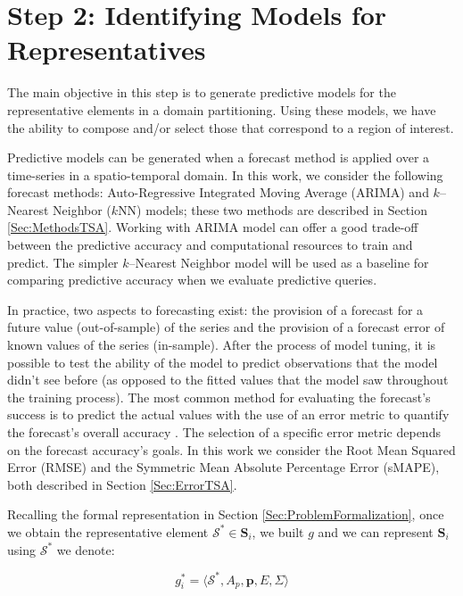 \section{Step 2: Identifying Models for Representatives}
\label{Sec:ModelRepresentatives}

The main objective in this step is to generate predictive models for the representative elements in a domain partitioning. Using these models, we have the ability to compose and/or select those that correspond to a region of interest.

Predictive models can be generated when a forecast method is applied over a time-series in a spatio-temporal domain. In this work, we consider the following forecast methods: Auto-Regressive Integrated Moving Average (ARIMA) and $k$--Nearest Neighbor ($k$NN) models; these two methods are described in Section \ref{Sec:MethodsTSA}. Working with ARIMA model can offer a good trade-off between the predictive accuracy and computational resources to train and predict. The simpler $k$--Nearest Neighbor model will be used as a baseline for comparing predictive accuracy when we evaluate predictive queries.

In practice, two aspects to forecasting exist: the provision of a forecast for a future value (out-of-sample) of the series and the provision of a forecast error of known values of the series (in-sample). After the process of model tuning, it is possible to test the ability of the model to predict observations that the model didn't see before (as opposed to the fitted values that the model saw throughout the training process). The most common method for evaluating the forecast's success is to predict the actual values with the use of an error metric to quantify the forecast's overall accuracy \cite{Hyndman2006}. The selection of a specific error metric depends on the forecast accuracy's goals. In this work we consider the Root Mean Squared Error (RMSE) and the Symmetric Mean Absolute Percentage Error (sMAPE), both described in Section \ref{Sec:ErrorTSA}.

Recalling the formal representation in Section \ref{Sec:ProblemFormalization}, once we obtain the representative element $\mathcal{S}^{*} \in \mathbf{S}_{i}$, we built $g$ and we can represent $\mathbf{S}_{i}$ using $\mathcal{S}^{*}$ we denote:

\begin{equation}
g^{*}_{i} = \langle \mathcal{S}^{*}, A_p, \mathbf{p}, E, \varSigma \rangle
\end{equation}

